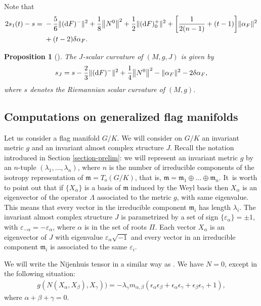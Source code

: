 \documentclass[pdftex]{sigma}%
\numberwithin{equation}{section}
\newtheorem{Proposition}[Theorem]{Proposition}
 { \theoremstyle{definition}
\newtheorem{Definition}[Theorem]{Definition}
\newtheorem{Question}[Theorem]{Question}
\newtheorem*{Notation}{Notation}
\newtheorem{Example}[Theorem]{Example}
\newtheorem{Remark}[Theorem]{Remark} }
\begin{document}
Note that\vspace{-1ex}
\begin{align*}
2s_{1}(t)-s={}&-\dfrac{5}{6}\|({\rm d}F)^{-}\|^{2}+\dfrac{1}{8}\big\|N^{0}\big\|^{2}+\dfrac{1}{2}\|({\rm d}F)_{0}^{+}\|^{2}+\bigg[\dfrac{1}{2(n-1)}+(t-1)\bigg]\|\alpha_{F}\|^{2}
\\
&+(t-2)\delta\alpha_{F}.
\end{align*}

\begin{Proposition}[\cite{fu}]
The $J$-scalar curvature of $(M,g,J)$ is given by\vspace{-1ex}
\begin{gather*}
s_{J}=s-\dfrac{2}{3}\|({\rm d}F)^{-}\|^{2}+\dfrac{1}{4}\big\|N^{0}\big\|^{2}-\|\alpha_{F}\|^{2}-2\delta\alpha_{F},
\end{gather*}
where $s$ denotes the Riemannian scalar curvature of $(M,g)$.
\end{Proposition}

\subsection{Computations on generalized flag manifolds} \label{sec-computations}
Let us consider a flag manifold $G/K$. We will consider on $G/K$ an invariant metric $g$ and an invariant almost complex structure $J$. Recall the notation introduced in Section \ref{section-prelim}: we will represent an invariant metric $g$ by an $n$-tuple $(\lambda_1,\ldots, \lambda_n)$, where $n$ is the number of irreducible components of the isotropy representation of $\mathfrak{m}=T_o(G/K)$, that is, $\mathfrak{m}=\mathfrak{m}_1\oplus \dots \oplus \mathfrak{m}_n$. It~is worth to point out that if $\{ X_\alpha \}$ is a basis of $\mathfrak{m}$ induced by the Weyl basis then $X_\alpha$ is an eigenvector of the operator $\Lambda$ associated to the metric $g$, with same eigenvalue. This means that every vector in the irreducible component $\mathfrak{m}_i$ has length $\lambda_i$. The invariant almost complex structure $J$ is parametrized by a set of sign $\{ \varepsilon_\alpha \} =\pm 1 $, with $\varepsilon_{-\alpha}=-\varepsilon_\alpha$, where $\alpha$ is in the set of roots $\Pi$. Each vector $X_\alpha$ is an eigenvector of $J$ with eigenvalue $\varepsilon_\alpha\sqrt{-1}$ and every vector in an irreducible component $\mathfrak{m}_i$ is associated to the same $\varepsilon_i$.

We will write the Nijenhuis tensor in a similar way as \cite{sn}. We have $N=0$, except in the following situation:
\begin{gather*}
g(N(X_{\alpha},X_{\beta}),X_{\gamma}))=-\lambda_{\gamma}m_{\alpha,\beta}(\epsilon_{\alpha}\epsilon_{\beta}
+\epsilon_{\alpha}\epsilon_{\gamma}+\epsilon_{\beta}\epsilon_{\gamma}+1),
\end{gather*}
where $\alpha+\beta+\gamma=0$.
\end{document}
